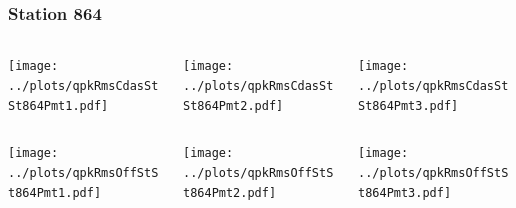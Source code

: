 \documentclass[aspectratio=169]{beamer}
\begin{document}
\begin{frame} 
  \frametitle{Station 864}
  \begin{center}
    \begin{columns}
      \begin{column}{0.33\textwidth}
        \texttt{[image: ../plots/qpkRmsCdasStSt864Pmt1.pdf]}
      \end{column}
      \begin{column}{0.33\textwidth}
        \texttt{[image: ../plots/qpkRmsCdasStSt864Pmt2.pdf]}
      \end{column}
      \begin{column}{0.33\textwidth}
        \texttt{[image: ../plots/qpkRmsCdasStSt864Pmt3.pdf]}
      \end{column}
    \end{columns}
  \end{center}

  \begin{center}
    \begin{columns}
      \begin{column}{0.33\textwidth}
        \texttt{[image: ../plots/qpkRmsOffStSt864Pmt1.pdf]}
      \end{column}
      \begin{column}{0.33\textwidth}
        \texttt{[image: ../plots/qpkRmsOffStSt864Pmt2.pdf]}
      \end{column}
      \begin{column}{0.33\textwidth}
        \texttt{[image: ../plots/qpkRmsOffStSt864Pmt3.pdf]}
      \end{column}
    \end{columns}
  \end{center}
\end{frame}
\end{document}
